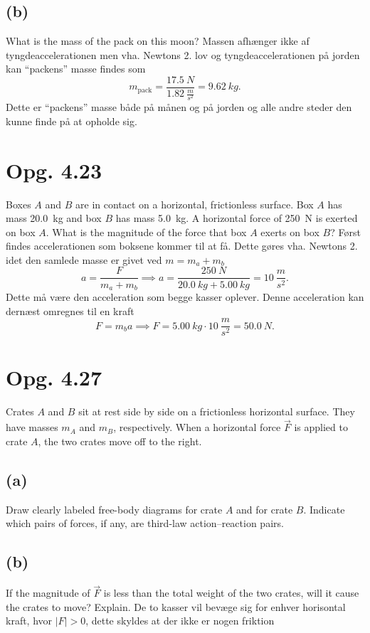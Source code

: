 \documentclass[12pt]{article}
\begin{document}
\subsection*{(b)}
What is the mass of the pack on this moon?
\bigbreak
Massen afhænger ikke af tyngdeaccelerationen men vha. Newtons 2. lov og tyngdeaccelerationen på jorden kan ``packens'' masse findes som
\[
m_{\mathrm{pack}} = \frac{\qty{17,5}{N}}{\qty{1,82}{\frac{m}{s^2}}} = \qty{9,62}{kg}
.\] 
Dette er ``packens'' masse både på månen og på jorden og alle andre steder den kunne finde på at opholde sig. 


\section*{Opg. 4.23}
Boxes $A$ and $B$ are in contact on a horizontal, frictionless surface. Box $A$ has mass \qty{20,0}{kg} and box $B$ has mass \qty{5,0}{kg}. A horizontal force of \qty{250}{N} is exerted on box $A$. What is the magnitude of the force that box $A$ exerts on box $B$?
\bigbreak
Først findes accelerationen som boksene kommer til at få. Dette gøres vha. Newtons 2. idet den samlede masse er givet ved $m = m_a + m_b$
\[
  a = \frac{F}{m_a + m_b} \implies a = \frac{\qty{250}{N}}{\qty{20,0}{kg} + \qty{5,00}{kg}} = \qty{10}{\frac{m}{s^2}}
.\] 
Dette må være den acceleration som begge kasser oplever. Denne acceleration kan dernæst omregnes til en kraft
\[
  F = m_b a \implies F = \qty{5,00}{kg} \cdot \qty{10}{\frac{m}{s^2}} = \qty{50,0}{N}
.\] 



\section*{Opg. 4.27}
Crates $A$ and $B$ sit at rest side by side on a frictionless horizontal surface. They have masses $m_A$ and $m_B$, respectively. When a horizontal force $ \Vec{F}$ is applied to crate $A$, the two crates move off to the right.


\subsection*{(a)}
Draw clearly labeled free-body diagrams for crate $A$ and for crate $B$. Indicate which pairs of forces, if any, are third-law action–reaction pairs.


\subsection*{(b)}
If the magnitude of $ \Vec{F}$ is less than the total weight of the two crates, will it cause the crates to move? Explain.
\bigbreak
De to kasser vil bevæge sig for enhver horisontal kraft, hvor $|F| > 0$, dette skyldes at der ikke er nogen friktion
\end{document}
